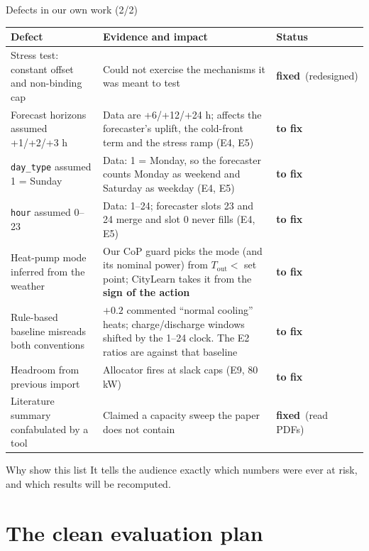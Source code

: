 \documentclass[aspectratio=169,10pt]{beamer}
\newcommand{\tagok}{\textcolor{stemsgreen}{\textbf{fixed}}}
\newcommand{\tagtodo}{\textcolor{stemsred}{\textbf{to fix}}}
\begin{document}
\begin{frame}{Defects in our own work (2/2)}
\scriptsize
\begin{tabularx}{\textwidth}{@{}>{\raggedright\arraybackslash}p{4.3cm}>{\raggedright\arraybackslash}X>{\raggedright\arraybackslash}p{2.1cm}@{}}
\toprule
Defect & Evidence and impact & Status \\
\midrule
Stress test: constant offset and non-binding cap & Could not exercise the mechanisms it was meant to test & \tagok\ (redesigned) \\
Forecast horizons assumed +1/+2/+3 h & Data are +6/+12/+24 h; affects the forecaster's uplift, the cold-front term and the stress ramp (E4, E5) & \tagtodo \\
\texttt{day\_type} assumed 1 = Sunday & Data: 1 = Monday, so the forecaster counts Monday as weekend and Saturday as weekday (E4, E5) & \tagtodo \\
\texttt{hour} assumed 0--23 & Data: 1--24; forecaster slots 23 and 24 merge and slot 0 never fills (E4, E5) & \tagtodo \\
Heat-pump mode inferred from the weather & Our CoP guard picks the mode (and its nominal power) from $T_{\text{out}} <$ set point; CityLearn takes it from the \textbf{sign of the action} & \tagtodo \\
Rule-based baseline misreads both conventions & $+0.2$ commented ``normal cooling'' heats; charge/discharge windows shifted by the 1--24 clock. The E2 ratios are against that baseline & \tagtodo \\
Headroom from previous import & Allocator fires at slack caps (E9, 80 kW) & \tagtodo \\
Literature summary confabulated by a tool & Claimed a capacity sweep the paper does not contain & \tagok\ (read PDFs) \\
\bottomrule
\end{tabularx}
\vspace{0.4em}
\begin{block}{Why show this list}
It tells the audience exactly which numbers were ever at risk, and which results will be recomputed.
\end{block}
\end{frame}

\section{The clean evaluation plan}
\end{document}
